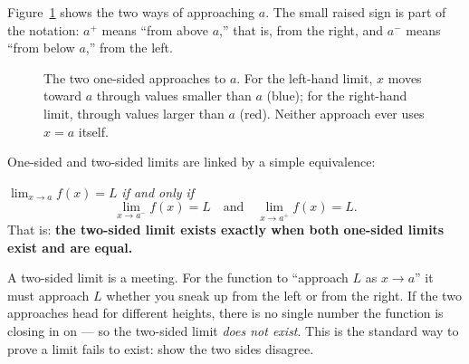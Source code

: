 Figure~\ref{ch07:fig-approach} shows the two ways of approaching $a$. The small
raised sign is part of the notation: $a^{+}$ means ``from above $a$,'' that is,
from the right, and $a^{-}$ means ``from below $a$,'' from the left.

\begin{figure}[htbp]
\centering
{}
\caption{The two one-sided approaches to $a$. For the left-hand limit,
$x$ moves toward $a$ through values smaller than $a$ (blue); for the
right-hand limit, through values larger than $a$ (red). Neither approach
ever uses $x=a$ itself.}
\label{ch07:fig-approach}
\end{figure}

One-sided and two-sided limits are linked by a simple equivalence:

\begin{theorem}[Two-sided $=$ both one-sided agreeing]
\label{ch07:thm-onesided}
$\lim_{x\to a} f(x) = L$ \emph{if and only if}
\[
  \lim_{x\to a^{-}} f(x) = L \quad\text{and}\quad \lim_{x\to a^{+}} f(x) = L.
\]
That is: \textbf{the two-sided limit exists exactly when both one-sided limits
exist and are equal.}
\end{theorem}

\begin{intuitionbox}
A two-sided limit is a meeting. For the function to ``approach $L$ as $x\to a$''
it must approach $L$ whether you sneak up from the left or from the right. If
the two approaches head for different heights, there is no single number the
function is closing in on --- so the two-sided limit \emph{does not exist}.
This is the standard way to prove a limit fails to exist: show the two sides
disagree.
\end{intuitionbox}

